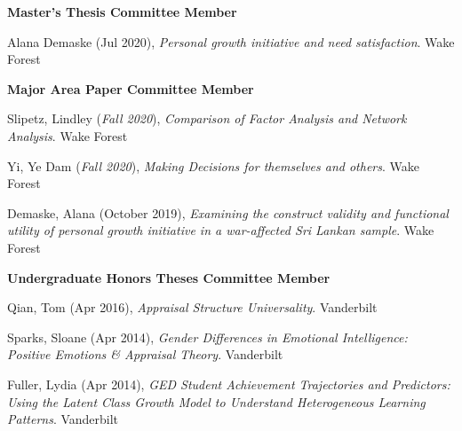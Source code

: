 {\large \textbf{Master's Thesis Committee Member}}%
\begin{etaremune}%
\item Alana Demaske (Jul 2020), \textit{Personal growth initiative and need satisfaction}. Wake Forest%
\end{etaremune}%
%
{\large \textbf{Major Area Paper Committee Member}}%
\begin{etaremune}%
\item Slipetz, Lindley (\textit{Fall 2020}), \textit{Comparison of Factor Analysis and Network Analysis}. Wake Forest%
\item Yi, Ye Dam (\textit{Fall 2020}), \textit{Making Decisions for themselves and others}. Wake Forest%
\item Demaske, Alana (October 2019), \textit{Examining the construct validity and functional utility of personal growth initiative in a war-affected Sri Lankan sample}. Wake Forest%
\end{etaremune}%
%
{\large \textbf{Undergraduate Honors Theses Committee Member}}
\begin{etaremune}
\item Qian, Tom (Apr 2016), \textit{Appraisal Structure Universality}. Vanderbilt%
%
\item Sparks, Sloane (Apr 2014), \textit{Gender Differences in Emotional Intelligence: Positive Emotions \& Appraisal Theory}. Vanderbilt%
\item Fuller, Lydia (Apr 2014), \textit{GED Student Achievement Trajectories and Predictors: Using the Latent Class Growth Model to Understand Heterogeneous Learning Patterns}. Vanderbilt%
\end{etaremune}
